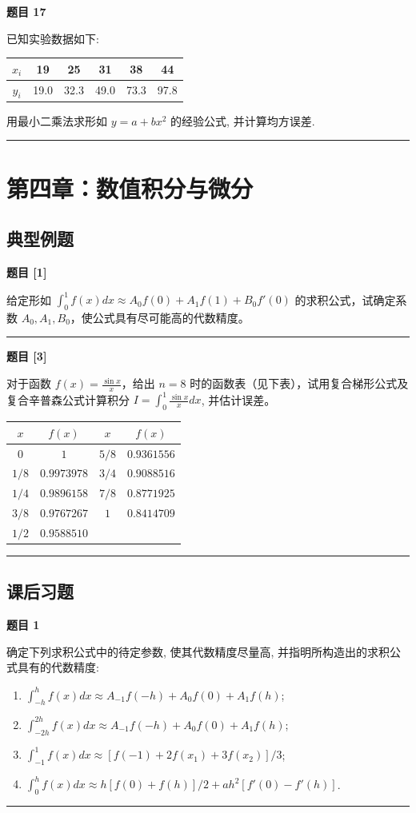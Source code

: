 \documentclass[a4paper,12pt]{ctexart}
\newcommand{\problem}[1]{
    \par\noindent\textbf{题目 #1} \quad
}
\newcommand{\workspace}[1][5cm]{
    \par
    \vspace{#1}
    \noindent\rule{\textwidth}{0.1pt} %
    \vspace{0.5em}
    \par
}
\begin{document}
\problem{17}
已知实验数据如下:
\begin{center}
\begin{tabular}{c|c|c|c|c|c}
\toprule
$x_i$ & 19 & 25 & 31 & 38 & 44 \\
\midrule
$y_i$ & 19.0 & 32.3 & 49.0 & 73.3 & 97.8 \\
\bottomrule
\end{tabular}
\end{center}
用最小二乘法求形如 $y = a + bx^2$ 的经验公式, 并计算均方误差.
\workspace[8cm]

\newpage

\section{第四章：数值积分与微分}

\subsection*{典型例题}

\problem{[1]}
给定形如 $\int_0^1 f(x)dx \approx A_0 f(0) + A_1 f(1) + B_0 f'(0)$ 的求积公式，试确定系数 $A_0, A_1, B_0$，使公式具有尽可能高的代数精度。
\workspace[6cm]

\problem{[3]}
对于函数 $f(x) = \frac{\sin x}{x}$，给出 $n=8$ 时的函数表（见下表），试用复合梯形公式及复合辛普森公式计算积分
$I = \int_0^1 \frac{\sin x}{x} dx$, 并估计误差。
\begin{table}[H]
\centering
\begin{tabular}{c c | c c}
\toprule
$x$ & $f(x)$ & $x$ & $f(x)$ \\
\midrule
$0$ & $1$ & $5/8$ & $0.9361556$ \\
$1/8$ & $0.9973978$ & $3/4$ & $0.9088516$ \\
$1/4$ & $0.9896158$ & $7/8$ & $0.8771925$ \\
$3/8$ & $0.9767267$ & $1$ & $0.8414709$ \\
$1/2$ & $0.9588510$ & & \\
\bottomrule
\end{tabular}
\end{table}
\workspace[8cm]

\subsection*{课后习题}

\problem{1}
确定下列求积公式中的待定参数, 使其代数精度尽量高, 并指明所构造出的求积公式具有的代数精度:
\begin{enumerate}
    \item $\int_{-h}^h f(x)dx \approx A_{-1}f(-h) + A_0f(0) + A_1f(h)$;
    \item $\int_{-2h}^{2h} f(x)dx \approx A_{-1}f(-h) + A_0f(0) + A_1f(h)$;
    \item $\int_{-1}^1 f(x)dx \approx [f(-1) + 2f(x_1) + 3f(x_2)]/3$;
    \item $\int_0^h f(x)dx \approx h[f(0) + f(h)]/2 + ah^2[f'(0) - f'(h)]$.
\end{enumerate}
\workspace[12cm]
\end{document}
